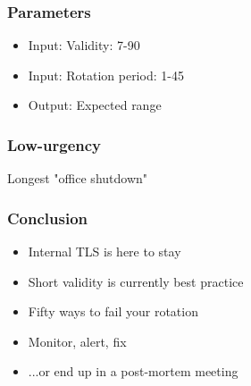 \begin{frame}
\frametitle{Parameters}

\begin{itemize}
\item Input: Validity: 7-90\pause
\item Input: Rotation period: 1-45\pause
\item Output: Expected range
\end{itemize}

\end{frame}

\begin{frame}
\frametitle{Low-urgency}

Longest "office shutdown"
\end{frame}

\begin{frame}
\frametitle{Conclusion}

\begin{itemize}
\item Internal TLS is here to stay
\item Short validity is currently best practice
\item Fifty ways to fail your rotation
\item Monitor, alert, fix \pause
\item ...or end up in a post-mortem meeting
\end{itemize}
\end{frame}


